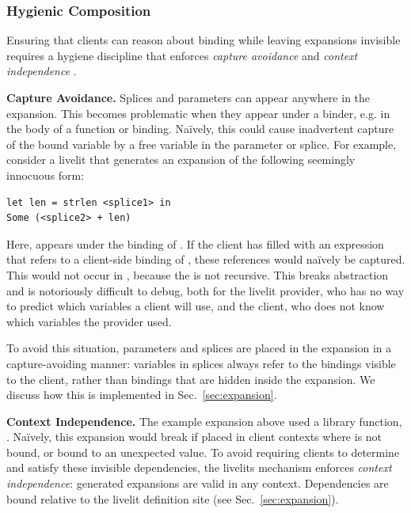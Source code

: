 
\subsubsection{Hygienic Composition}\label{sec:hygiene}


Ensuring that clients can reason about binding while leaving expansions
 invisible
 requires a hygiene discipline that enforces \emph{capture avoidance}
and \emph{context independence} \cite{TLMs,adamsHygiene}.

\textbf{Capture Avoidance.}
Splices and parameters can appear anywhere in the expansion.
This becomes problematic when
they appear under a binder, e.g. in the body of a function or  binding.
Na\"ively, this could cause inadvertent capture of the bound variable by a free variable
in the parameter or splice. For example, consider a livelit that generates an expansion
of the following seemingly innocuous form:
\begin{lstlisting}[numbers=none]
let len = strlen <splice1> in
Some (<splice2> + len)
\end{lstlisting}
Here,  appears under the binding of . If the client has filled
 with an expression that refers to a client-side binding of ,
these references would na\"ively be captured. This would not occur in ,
because the  is not recursive.
This breaks abstraction and is notoriously difficult to debug,
both for the livelit provider, who has no way to predict which variables a client will use,
 and the client, who does not know which variables the provider used.

To avoid this situation, parameters and splices are placed in the expansion
in a capture-avoiding manner: variables in splices
always refer to the bindings visible to the client,
rather than bindings that are hidden inside the expansion.
We discuss how this is implemented in Sec.~\ref{sec:expansion}.

\textbf{Context Independence.}
The example expansion above used a library function, .
Na\"ively, this expansion would break if placed
in client contexts where  is not bound, or bound to
an unexpected value.
To avoid requiring clients to determine and satisfy these invisible
dependencies, the livelits mechanism enforces \emph{context independence}:
generated expansions are valid in any context. Dependencies are bound
relative to the livelit definition site (see Sec.~\ref{sec:expansion}).

